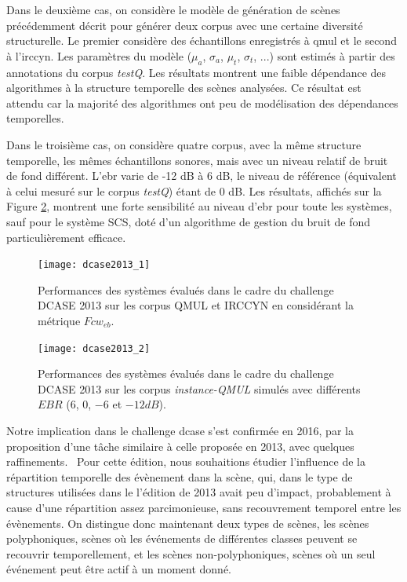   Dans le deuxième cas, on considère le modèle de génération de scènes précédemment décrit pour générer deux corpus avec une certaine diversité structurelle. Le premier considère des échantillons enregistrés à qmul et le second à l'irccyn. Les paramètres du modèle ($\mu_a$, $\sigma_a$, $\mu_t$, $\sigma_t$, ...) sont estimés à partir des annotations du corpus \emph{testQ}. Les résultats montrent une faible dépendance des algorithmes à la structure temporelle des scènes analysées. Ce résultat est attendu car la majorité des algorithmes ont peu de modélisation des dépendances temporelles.

  Dans le troisième cas, on considère quatre corpus, avec la même structure temporelle, les mêmes échantillons sonores, mais avec un niveau relatif de bruit de fond différent. L'ebr varie de -12 dB à 6 dB, le niveau de référence (équivalent à celui mesuré sur le corpus \emph{testQ})  étant de 0 dB. Les résultats, affichés sur la Figure \ref{fig:ebr}, montrent une forte sensibilité au niveau d'ebr pour toute les systèmes, sauf pour le système SCS, doté d'un algorithme de gestion du bruit de fond particulièrement efficace\cite{lafayhal-01111381}.

  \begin{figure}[t]
    \texttt{[image: dcase2013\_1]}
    \caption{Performances des systèmes évalués dans le cadre du challenge DCASE 2013 sur les corpus QMUL et IRCCYN en considérant la métrique $Fcw_{eb}$.}
    \label{fig:irccyn}
    \vspace{-4em}
  \end{figure}

  \begin{figure}[t]
    \begin{center}
      \texttt{[image: dcase2013\_2]}
      \caption{Performances des systèmes évalués dans le cadre du challenge DCASE 2013 sur les corpus \emph{instance-QMUL} simulés avec différents $EBR$ ($6$, $0$, $-6$ et $-12dB$).}
      \label{fig:ebr}
    \end{center}
    \vspace{-4em}
  \end{figure}

  Notre implication dans le challenge dcase s'est confirmée en 2016, par la proposition d'une tâche similaire à celle proposée en 2013, avec quelques raffinements.~\cite{mesa} Pour cette édition, nous souhaitions étudier l'influence de la répartition temporelle des évènement dans la scène, qui, dans le type de structures utilisées dans le l'édition de 2013 avait peu d'impact, probablement à cause d'une répartition assez parcimonieuse, sans recouvrement temporel entre les évènements. On distingue donc maintenant deux types de scènes, les scènes polyphoniques, scènes où les événements de différentes classes peuvent se recouvrir temporellement, et les scènes non-polyphoniques, scènes où un seul événement peut être actif à un moment donné.

